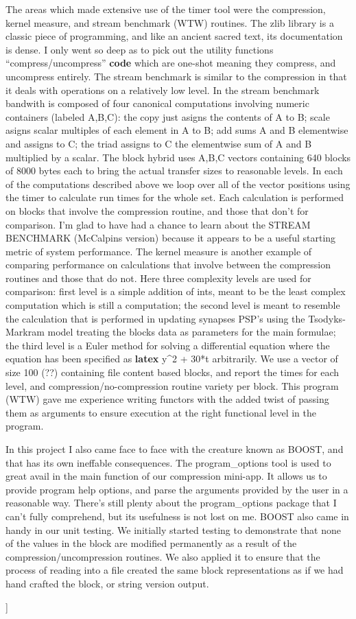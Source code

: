 \documentclass[12pt,twocolumn]{article}
\begin{document}
The areas which made extensive use of the timer tool were the
compression, kernel measure, and stream benchmark (WTW) routines. The
zlib library is a classic piece of programming, and like an ancient
sacred text, its documentation is dense. I only went so deep as to pick
out the utility functions ``compress/uncompress'' \textbf{code} which
are one-shot meaning they compress, and uncompress entirely. The stream
benchmark is similar to the compression in that it deals with operations
on a relatively low level. In the stream benchmark bandwith is composed
of four canonical computations involving numeric containers (labeled
A,B,C): the copy just asigns the contents of A to B; scale asigns scalar
multiples of each element in A to B; add sums A and B elementwise and
assigns to C; the triad assigns to C the elementwise sum of A and B
multiplied by a scalar. The block hybrid uses A,B,C vectors containing
640 blocks of 8000 bytes each to bring the actual transfer sizes to
reasonable levels. In each of the computations described above we loop
over all of the vector positions using the timer to calculate run times
for the whole set. Each calculation is performed on blocks that involve
the compression routine, and those that don't for comparison. I'm glad
to have had a chance to learn about the STREAM BENCHMARK (McCalpins
version) because it appears to be a useful starting metric of system
performance. The kernel measure is another example of comparing
performance on calculations that involve between the compression
routines and those that do not. Here three complexity levels are used
for comparison: first level is a simple addition of ints, meant to be
the least complex computation which is still a computation; the second
level is meant to resemble the calculation that is performed in updating
synapses PSP's using the Tsodyks-Markram model treating the blocks data
as parameters for the main formulae; the third level is a Euler method
for solving a differential equation where the equation has been
specified as \textbf{latex} y\^{}2 + 30*t arbitrarily. We use a vector
of size 100 (??) containing file content based blocks, and report the
times for each level, and compression/no-compression routine variety per
block. This program (WTW) gave me experience writing functors with the
added twist of passing them as arguments to ensure execution at the
right functional level in the program.

In this project I also came face to face with the creature known as
BOOST, and that has its own ineffable consequences. The program\_options
tool is used to great avail in the main function of our compression
mini-app. It allows us to provide program help options, and parse the
arguments provided by the user in a reasonable way. There's still plenty
about the program\_options package that I can't fully comprehend, but
its usefulness is not lost on me. BOOST also came in handy in our unit
testing. We initially started testing to demonstrate that none of the
values in the block are modified permanently as a result of the
compression/uncompression routines. We also applied it to ensure that
the process of reading into a file created the same block
representations as if we had hand crafted the block, or string version
output.

{]}
\end{document}
